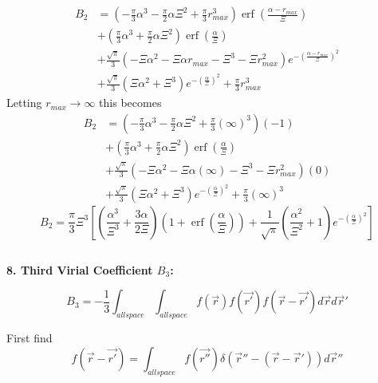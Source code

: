 \documentclass[double,12pt]{beavtex}
\begin{document}
\begin{align}
  B_2 &= \left(-\frac{\pi}{3}\alpha^3-\frac{\pi}{2}\alpha\Xi^2+\frac{\pi}{3}r_{max}^3\right)\operatorname{erf}\left(\frac{\alpha-r_{max}}{\Xi}\right) \\
      &+ \left(\frac{\pi}{3}\alpha^3+\frac{\pi}{2}\alpha\Xi^2\right)\operatorname{erf}\left(\frac{\alpha}{\Xi}\right) \\
      &+ \frac{\sqrt{\pi}}{3}\left(-\Xi\alpha^2-\Xi\alpha r_{max}-\Xi^3-\Xi r_{max}^2\right)e^{-{\left(\frac{\alpha-r_{max}}{\Xi}\right)^2}} \\
      &+ \frac{\sqrt{\pi}}{3}\left(\Xi\alpha^2+\Xi^3\right)e^{-\left(\frac{\alpha}{\Xi}\right)^2}+\frac{\pi}{3}r_{max}^3 
\end{align}
Letting $r_{max}\rightarrow\infty$ this becomes
\begin{align}
  B_2 &= \left(-\frac{\pi}{3}\alpha^3-\frac{\pi}{2}\alpha\Xi^2+\frac{\pi}{3}\left(\infty\right)^3\right)\left(-1\right) \\
      &+ \left(\frac{\pi}{3}\alpha^3+\frac{\pi}{2}\alpha\Xi^2\right)\operatorname{erf}\left(\frac{\alpha}{\Xi}\right) \\
      &+ \frac{\sqrt{\pi}}{3}\left(-\Xi\alpha^2-\Xi\alpha\left(\infty\right)-\Xi^3-\Xi r_{max}^2\right)\left(0\right) \\
      &+ \frac{\sqrt{\pi}}{3}\left(\Xi\alpha^2+\Xi^3\right)e^{-\left(\frac{\alpha}{\Xi}\right)^2}+\frac{\pi}{3}\left(\infty\right)^3 
\end{align}
\begin{equation}B_2 = \frac{\pi}{3}\Xi^3\left[\left(\frac{\alpha^3}{\Xi^3}+\frac{3\alpha}{2\Xi}\right)\left(1+\operatorname{erf}\left(\frac{\alpha}{\Xi}\right)\right)+\frac{1}{\sqrt{\pi}}\left(\frac{\alpha^2}{\Xi^2}+1\right)e^{-\left(\frac{\alpha}{\Xi}\right)^2}\right]\end{equation}

\[{}\]

\textbf{8. Third Virial Coefficient $B_{3}$:}

\begin{equation}\label{B3}B_3=-\frac{1}{3}\int_{allspace}\int_{allspace}f(\vec{r})f(\vec{r'})f(\vec{r}-\vec{r'})d\vec rd\vec r'\end{equation}

First find
\begin{equation}f(\vec{r}-\vec{r'})=\int_{allspace}f(\vec{r''})\delta(\vec{r}''-(\vec{r}-\vec{r}'))d\vec r'' \end{equation}
\end{document}
